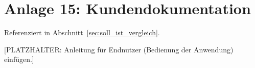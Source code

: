 \section*{Anlage 15: Kundendokumentation}
\label{anh:kundendokumentation}
Referenziert in Abschnitt~\ref{sec:soll_ist_vergleich}.

[PLATZHALTER: Anleitung f\"ur Endnutzer (Bedienung der Anwendung) einf\"ugen.]
